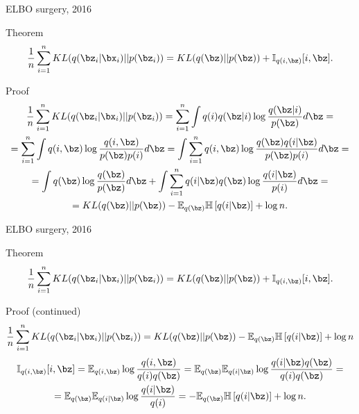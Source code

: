 \begin{frame}{ELBO surgery, 2016}
	\begin{block}{Theorem}
	\[
	    \frac{1}{n} \sum_{i=1}^n KL(q(\bz_i | \bx_i) || p(\bz_i)) = KL(q(\bz) || p(\bz)) + \mathbb{I}_{q(i, \bz)} [i, \bz].
	\]
	\end{block}
	\begin{block}{Proof}
	\vspace{-0.3cm}
	{\footnotesize
	\begin{multline*}
	    \frac{1}{n} \sum_{i=1}^n KL(q(\bz_i | \bx_i) || p(\bz_i)) = \sum_{i=1}^n \int q(i) q(\bz | i) \log \frac{q(\bz | i)}{p(\bz)} d \bz = \\
	    = \sum_{i=1}^n \int q(i, \bz) \log \frac{q(i, \bz)}{p(\bz)p(i)} d \bz =
	    \int \sum_{i=1}^n q(i, \bz) \log \frac{ q (\bz) q(i | \bz) }{p(\bz) p(i) } d \bz = \\
	    = \int q(\bz) \log \frac{q(\bz)}{p(\bz)} d\bz + \int \sum_{i=1}^n q(i | \bz) q(\bz) \log \frac{q(i | \bz)}{p(i)} d \bz = \\
	    = KL (q(\bz) || p(\bz)) - \mathbb{E}_{q(\bz)} \mathbb{H} \left[q(i | \bz)  \right] + \log n.
	\end{multline*}
	}
	\end{block}

\end{frame}
\begin{frame}{ELBO surgery, 2016}
	\begin{block}{Theorem}
	\[
	    \frac{1}{n} \sum_{i=1}^n KL(q(\bz_i | \bx_i) || p(\bz_i)) = KL(q(\bz) || p(\bz)) + \mathbb{I}_{q(i, \bz)} [i, \bz].
	\]
	\end{block}
	\begin{block}{Proof (continued)}
	{\footnotesize
	\[
	    \frac{1}{n} \sum_{i=1}^n KL(q(\bz_i | \bx_i) || p(\bz_i)) = KL (q(\bz) || p(\bz)) - \mathbb{E}_{q(\bz)} \mathbb{H} \left[q(i | \bz) \right] + \log n
	\]
	\begin{multline*}
	    \mathbb{I}_{q(i, \bz)} [i, \bz] = \mathbb{E}_{q(i, \bz)} \log \frac{q(i, \bz)}{q(i)q(\bz)} = \mathbb{E}_{q(\bz)} \mathbb{E}_{q(i | \bz)} \log \frac{q(i | \bz) q(\bz)}{q(i)q(\bz)} = \\
	    = \mathbb{E}_{q(\bz)} \mathbb{E}_{q(i | \bz)} \log \frac{q(i | \bz)}{q(i)} = - \mathbb{E}_{q(\bz)} \mathbb{H} \left[ q(i | \bz) \right] + \log n.
	\end{multline*}
	}
	\end{block}

\end{frame}
